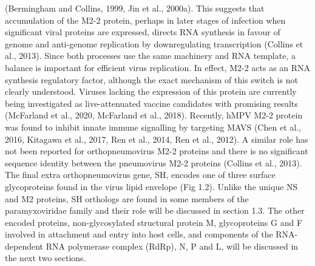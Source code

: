 (Bermingham and Collins, 1999, Jin et al., 2000a). This suggests that accumulation of the M2-2 protein, perhaps in later stages of infection when significant viral proteins are expressed, directs RNA synthesis in favour of genome and anti-genome replication by downregulating transcription (Collins et al., 2013). Since both processes use the same machinery and RNA template, a balance is important for efficient virus replication. In effect, M2-2 acts as an RNA synthesis regulatory factor, although the exact mechanism of this switch is not clearly understood. Viruses lacking the expression of this protein are currently being investigated as live-attenuated vaccine candidates with promising results (McFarland et al., 2020, McFarland et al., 2018). Recently, hMPV M2-2 protein was found to inhibit innate immune signalling by targeting MAVS (Chen et al., 2016, Kitagawa et al., 2017, Ren et al., 2014, Ren et al., 2012). A similar role has not been reported for orthopneumovirus M2-2 proteins and there is no significant sequence identity between the pneumovirus M2-2 proteins (Collins et al., 2013). The final extra orthopneumovirus gene, SH, encodes one of three surface glycoproteins found in the virus lipid envelope (Fig 1.2). Unlike the unique NS and M2 proteins, SH orthologs are found in some members of the paramyxoviridae family and their role will be discussed in section 1.3. The other encoded proteins, non-glycosylated structural protein M, glycoproteins G and F involved in attachment and entry into host cells, and components of the RNA-dependent RNA polymerase complex (RdRp), N, P and L, will be discussed in the next two sections.

